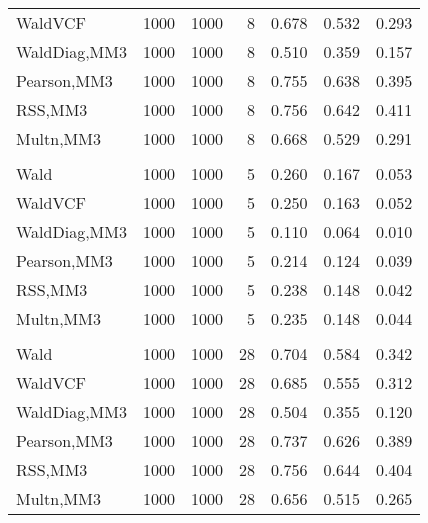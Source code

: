 \documentclass[
]{article}
\begin{document}
\begin{table}[H]
{\begin{tabular}[t]{lrrrrrr}
\hspace{1em}WaldVCF & 1000 & 1000 & 8 & 0.678 & 0.532 & 0.293\\
\hspace{1em}WaldDiag,MM3 & 1000 & 1000 & 8 & 0.510 & 0.359 & 0.157\\
\hspace{1em}Pearson,MM3 & 1000 & 1000 & 8 & 0.755 & 0.638 & 0.395\\
\hspace{1em}RSS,MM3 & 1000 & 1000 & 8 & 0.756 & 0.642 & 0.411\\
\hspace{1em}Multn,MM3 & 1000 & 1000 & 8 & 0.668 & 0.529 & 0.291\\
\addlinespace[0.3em]
\multicolumn{7}{l}{\textbf{2F 10V}}\\
\hspace{1em}Wald & 1000 & 1000 & 5 & 0.260 & 0.167 & 0.053\\
\hspace{1em}WaldVCF & 1000 & 1000 & 5 & 0.250 & 0.163 & 0.052\\
\hspace{1em}WaldDiag,MM3 & 1000 & 1000 & 5 & 0.110 & 0.064 & 0.010\\
\hspace{1em}Pearson,MM3 & 1000 & 1000 & 5 & 0.214 & 0.124 & 0.039\\
\hspace{1em}RSS,MM3 & 1000 & 1000 & 5 & 0.238 & 0.148 & 0.042\\
\hspace{1em}Multn,MM3 & 1000 & 1000 & 5 & 0.235 & 0.148 & 0.044\\
\addlinespace[0.3em]
\multicolumn{7}{l}{\textbf{3F 15V}}\\
\hspace{1em}Wald & 1000 & 1000 & 28 & 0.704 & 0.584 & 0.342\\
\hspace{1em}WaldVCF & 1000 & 1000 & 28 & 0.685 & 0.555 & 0.312\\
\hspace{1em}WaldDiag,MM3 & 1000 & 1000 & 28 & 0.504 & 0.355 & 0.120\\
\hspace{1em}Pearson,MM3 & 1000 & 1000 & 28 & 0.737 & 0.626 & 0.389\\
\hspace{1em}RSS,MM3 & 1000 & 1000 & 28 & 0.756 & 0.644 & 0.404\\
\hspace{1em}Multn,MM3 & 1000 & 1000 & 28 & 0.656 & 0.515 & 0.265\\
\bottomrule
\end{tabular}}
\endgroup{}
\end{table}
\end{document}

